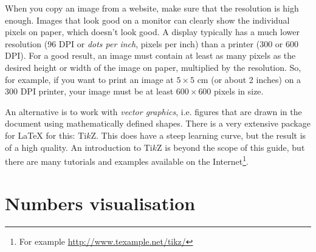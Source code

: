 When you copy an image from a website, make sure that the resolution is high enough. Images that look good on a monitor can clearly show the individual pixels on paper, which doesn't look good. A display typically has a much lower resolution (96 DPI or \emph{dots per inch}, pixels per inch) than a printer (300 or 600 DPI). For a good result, an image must contain at least as many pixels as the desired height or width of the image on paper, multiplied by the resolution. So, for example, if you want to print an image at $5 \times 5$ cm (or about 2 inches) on a 300 DPI printer, your image must be at least $600 \times 600$ pixels in size.

An alternative is to work with \emph{vector graphics}, i.e. figures that are drawn in the document using mathematically defined shapes. There is a very extensive package for {\LaTeX} for this: Ti$k$Z. This does have a steep learning curve, but the result is of a high quality. An introduction to Ti$k$Z is beyond the scope of this guide, but there are many tutorials and examples available on the Internet\footnote{For example \url{http://www.texample.net/tikz/}}.

%

%
%
%


\section{Numbers visualisation }
\label{sec:numbersvisualisation}


